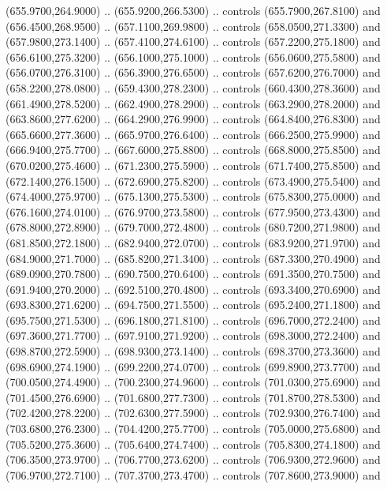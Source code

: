 {\begin{scope}[y=0.80pt, x=0.80pt, yscale=-1, xscale=1, inner sep=0pt, outer sep=0pt, #1]
      (655.9700,264.9000) .. (655.9200,266.5300) .. controls (655.7900,267.8100) and
      (656.4500,268.9500) .. (657.1100,269.9800) .. controls (658.0500,271.3300) and
      (657.9800,273.1400) .. (657.4100,274.6100) .. controls (657.2200,275.1800) and
      (656.6100,275.3200) .. (656.1000,275.1000) .. controls (656.0600,275.5800) and
      (656.0700,276.3100) .. (656.3900,276.6500) .. controls (657.6200,276.7000) and
      (658.2200,278.0800) .. (659.4300,278.2300) .. controls (660.4300,278.3600) and
      (661.4900,278.5200) .. (662.4900,278.2900) .. controls (663.2900,278.2000) and
      (663.8600,277.6200) .. (664.2900,276.9900) .. controls (664.8400,276.8300) and
      (665.6600,277.3600) .. (665.9700,276.6400) .. controls (666.2500,275.9900) and
      (666.9400,275.7700) .. (667.6000,275.8800) .. controls (668.8000,275.8500) and
      (670.0200,275.4600) .. (671.2300,275.5900) .. controls (671.7400,275.8500) and
      (672.1400,276.1500) .. (672.6900,275.8200) .. controls (673.4900,275.5400) and
      (674.4000,275.9700) .. (675.1300,275.5300) .. controls (675.8300,275.0000) and
      (676.1600,274.0100) .. (676.9700,273.5800) .. controls (677.9500,273.4300) and
      (678.8000,272.8900) .. (679.7000,272.4800) .. controls (680.7200,271.9800) and
      (681.8500,272.1800) .. (682.9400,272.0700) .. controls (683.9200,271.9700) and
      (684.9000,271.7000) .. (685.8200,271.3400) .. controls (687.3300,270.4900) and
      (689.0900,270.7800) .. (690.7500,270.6400) .. controls (691.3500,270.7500) and
      (691.9400,270.2000) .. (692.5100,270.4800) .. controls (693.3400,270.6900) and
      (693.8300,271.6200) .. (694.7500,271.5500) .. controls (695.2400,271.1800) and
      (695.7500,271.5300) .. (696.1800,271.8100) .. controls (696.7000,272.2400) and
      (697.3600,271.7700) .. (697.9100,271.9200) .. controls (698.3000,272.2400) and
      (698.8700,272.5900) .. (698.9300,273.1400) .. controls (698.3700,273.3600) and
      (698.6900,274.1900) .. (699.2200,274.0700) .. controls (699.8900,273.7700) and
      (700.0500,274.4900) .. (700.2300,274.9600) .. controls (701.0300,275.6900) and
      (701.4500,276.6900) .. (701.6800,277.7300) .. controls (701.8700,278.5300) and
      (702.4200,278.2200) .. (702.6300,277.5900) .. controls (702.9300,276.7400) and
      (703.6800,276.2300) .. (704.4200,275.7700) .. controls (705.0000,275.6800) and
      (705.5200,275.3600) .. (705.6400,274.7400) .. controls (705.8300,274.1800) and
      (706.3500,273.9700) .. (706.7700,273.6200) .. controls (706.9300,272.9600) and
      (706.9700,272.7100) .. (707.3700,273.4700) .. controls (707.8600,273.9000) and

\end{scope}}
